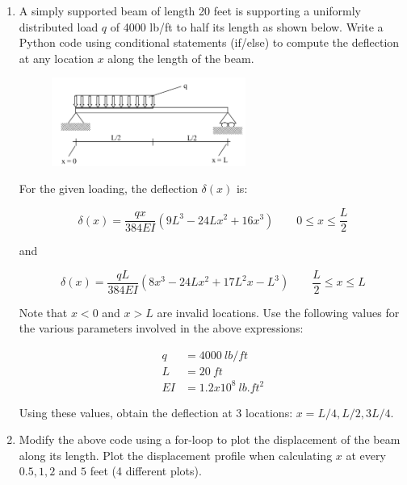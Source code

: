\documentclass[a4paper,12pt]{article}
\begin{document}
\begin{enumerate}
	\item A simply supported beam of length 20 feet is supporting a uniformly distributed load $q$ of 4000 lb/ft to half its length as shown below. Write a Python code using conditional statements (if/else) to compute the deflection at any location $x$ along the length of the beam.

	\begin{figure}[ht]
		\centering
		\includegraphics[width=0.6\textwidth]{ss-beam.png}
	\end{figure}

	For the given loading, the deflection $\delta(x)$ is:
	
	\begin{equation*}
		\delta(x) = \frac{q x}{384EI}(9L^3 - 24Lx^2 + 16x^3) \qquad 0 \le x \le \frac{L}{2}
	\end{equation*}
	
	and 

	\begin{equation*}
	\delta(x) = \frac{q L}{384EI}(8x^3 - 24Lx^2 + 17L^2x -L^3) \qquad \frac{L}{2} \le x \le L
	\end{equation*}
	
	Note that $x < 0$ and $x > L$ are invalid locations. Use the following values for the various parameters involved in the above expressions:
	
	\begin{align*}
		q & = 4000 ~lb/ft\\
		L & = 20 ~ft\\
		EI & = 1.2x10^8 ~lb.ft^2
	\end{align*}
	
	Using these values, obtain the deflection at 3 locations: $x = L/4, L/2, 3L/4$.
	
	\item Modify the above code using a for-loop to plot the displacement of the beam along its length. Plot the displacement profile when calculating $x$ at every $0.5, 1, 2$ and $5$ feet (4 different plots).
\end{enumerate}
\end{document}
